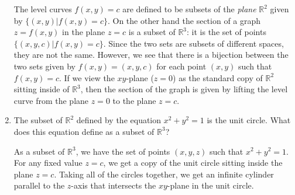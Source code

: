\documentclass[letterpaper,12pt]{article}
\newcommand{\R}{\mathbb{R}}
\begin{document}
\begin{enumerate}
\bigskip

The level curves $f(x,y)=c$ are defined to be subsets of the {\em plane} $\R^2$ given by $\{(x,y) | f(x,y)=c\}$. On the other hand the section of a graph $z=f(x,y)$ in the plane $z=c$ is a subset of $\R^3$: it is the set of points $\{(x,y,c) | f(x,y)=c\}$. Since the two sets are subsets of different spaces, they are not the same. However, we see that there is a bijection between the two sets given by $f(x,y) = (x,y,c)$ for each point $(x,y)$ such that $f(x,y)=c$. If we view the $xy$-plane ($z=0$) as the standard copy of $\R^2$ sitting inside of $\R^3$, then the section of the graph is given by lifting the level curve from the plane $z=0$ to the plane $z=c$.

\bigskip

 \item The subset of $\R^2$ defined by the equation $x^2+y^2=1$ is the unit circle. What does this equation define as a subset of $\R^3$?

\bigskip

As a subset of $\R^3$, we have the set of points $(x,y,z)$ such that $x^2+y^2=1$. For any fixed value $z=c$, we get a copy of the unit circle sitting inside the plane $z=c$. Taking all of the circles together, we get an infinite cylinder parallel to the $z$-axis that intersects the $xy$-plane in the unit circle.
\end{enumerate}
\end{document}
